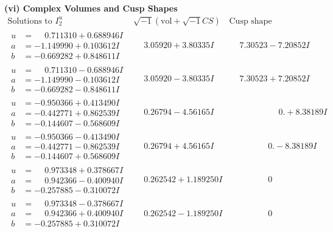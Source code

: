 \documentclass[1p]{elsarticle_modified}
\theoremstyle{definition}
\newcommand{\I}{\sqrt{-1}}
\begin{document}
\newpage\flushleft \textbf{(vi) Complex Volumes and Cusp Shapes}
$$\begin{array}{c|c|c}  
\text{Solutions to }I^u_{2}& \I (\text{vol} + \sqrt{-1}CS) & \text{Cusp shape}\\
 \hline 
\begin{aligned}
u &= \phantom{-}0.711310 + 0.688946 I \\
a &= -1.149990 + 0.103612 I \\
b &= -0.669282 + 0.848611 I\end{aligned}
 & \phantom{-}3.05920 + 3.80335 I & \phantom{-}7.30523 - 7.20852 I \\ \hline\begin{aligned}
u &= \phantom{-}0.711310 - 0.688946 I \\
a &= -1.149990 - 0.103612 I \\
b &= -0.669282 - 0.848611 I\end{aligned}
 & \phantom{-}3.05920 - 3.80335 I & \phantom{-}7.30523 + 7.20852 I \\ \hline\begin{aligned}
u &= -0.950366 + 0.413490 I \\
a &= -0.442771 + 0.862539 I \\
b &= -0.144607 - 0.568609 I\end{aligned}
 & \phantom{-}0.26794 - 4.56165 I & \phantom{-0.000000 -}0. + 8.38189 I \\ \hline\begin{aligned}
u &= -0.950366 - 0.413490 I \\
a &= -0.442771 - 0.862539 I \\
b &= -0.144607 + 0.568609 I\end{aligned}
 & \phantom{-}0.26794 + 4.56165 I & \phantom{-0.000000 } 0. - 8.38189 I \\ \hline\begin{aligned}
u &= \phantom{-}0.973348 + 0.378667 I \\
a &= \phantom{-}0.942366 - 0.400940 I \\
b &= -0.257885 - 0.310072 I\end{aligned}
 & \phantom{-}0.262542 + 1.189250 I & \phantom{-0.000000 } 0 \\ \hline\begin{aligned}
u &= \phantom{-}0.973348 - 0.378667 I \\
a &= \phantom{-}0.942366 + 0.400940 I \\
b &= -0.257885 + 0.310072 I\end{aligned}
 & \phantom{-}0.262542 - 1.189250 I & \phantom{-0.000000 } 0 \\ \hline\begin{aligned}

\end{aligned}
\end{array}$$
\end{document}
